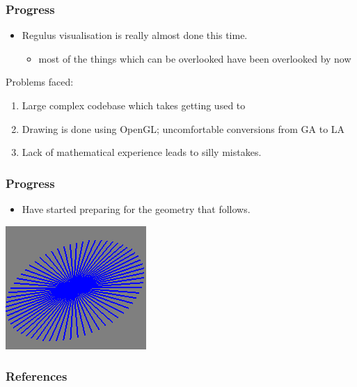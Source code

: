 \documentclass{beamer}
\begin{document}
  \begin{frame}
    \frametitle{Progress}
    
    \begin{itemize}
      \item Regulus visualisation is really almost done this time.
        \begin{itemize}
          \item most of the things which can be overlooked have been
            overlooked by now
        \end{itemize}
    \end{itemize}
    Problems faced:
    \begin{enumerate}
      \item Large complex codebase which takes getting used to
      \item Drawing is done using OpenGL; uncomfortable conversions
        from GA to LA
      \item Lack of mathematical experience leads to silly mistakes.
    \end{enumerate}
  \end{frame}

  \begin{frame}
    \frametitle{Progress}
    
    \begin{itemize}
    \item Have started preparing for the geometry that follows.
    \end{itemize}
    \begin{center}
      \includegraphics{point.png}
    \end{center}
  \end{frame}


\begin{frame}
  \frametitle{References}
  
\end{frame}
\end{document}
